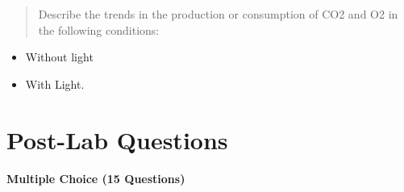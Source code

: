 \documentclass[
  letterpaper,
  DIV=11,
  numbers=noendperiod]{scrreprt}
\begin{document}
\begin{quote}
Describe the trends in the production or consumption of CO2 and O2 in
the following conditions:
\end{quote}

\begin{itemize}
\item
  Without light
\item
  With Light.
\end{itemize}

\section{\texorpdfstring{\textbf{Post-Lab
Questions}}{Post-Lab Questions}}\label{post-lab-questions-1}

\textbf{Multiple Choice (15 Questions)}
\end{document}
